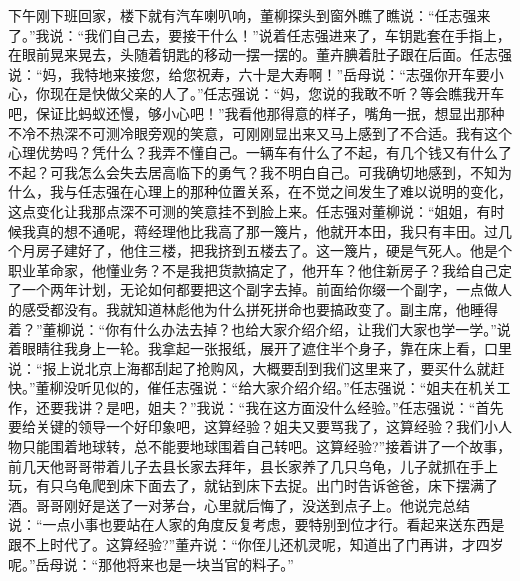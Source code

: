 \documentclass[12pt,oneside]{book}
\begin{document}
下午刚下班回家，楼下就有汽车喇叭响，董柳探头到窗外瞧了瞧说：``任志强来了。''我说：``我们自己去，要接干什么！''说着任志强进来了，车钥匙套在手指上，在眼前晃来晃去，头随着钥匙的移动一摆一摆的。董卉腆着肚子跟在后面。任志强说：``妈，我特地来接您，给您祝寿，六十是大寿啊！''岳母说：``志强你开车要小心，你现在是快做父亲的人了。''任志强说：``妈，您说的我敢不听？等会瞧我开车吧，保证比蚂蚁还慢，够小心吧！''我看他那得意的样子，嘴角一抿，想显出那种不冷不热深不可测冷眼旁观的笑意，可刚刚显出来又马上感到了不合适。我有这个心理优势吗？凭什么？我弄不懂自己。一辆车有什么了不起，有几个钱又有什么了不起？可我怎么会失去居高临下的勇气？我不明白自己。可我确切地感到，不知为什么，我与任志强在心理上的那种位置关系，在不觉之间发生了难以说明的变化，这点变化让我那点深不可测的笑意挂不到脸上来。任志强对董柳说：``姐姐，有时候我真的想不通呢，蒋经理他比我高了那一篾片，他就开本田，我只有丰田。过几个月房子建好了，他住三楼，把我挤到五楼去了。这一篾片，硬是气死人。他是个职业革命家，他懂业务？不是我把货款搞定了，他开车？他住新房子？我给自己定了一个两年计划，无论如何都要把这个副字去掉。前面给你缀一个副字，一点做人的感受都没有。我就知道林彪他为什么拼死拼命也要搞政变了。副主席，他睡得着？''董柳说：``你有什么办法去掉？也给大家介绍介绍，让我们大家也学一学。''说着眼睛往我身上一轮。我拿起一张报纸，展开了遮住半个身子，靠在床上看，口里说：``报上说北京上海都刮起了抢购风，大概要刮到我们这里来了，要买什么就赶快。''董柳没听见似的，催任志强说：``给大家介绍介绍。''任志强说：``姐夫在机关工作，还要我讲？是吧，姐夫？''我说：``我在这方面没什么经验。''任志强说：``首先要给关键的领导一个好印象吧，这算经验？姐夫又要骂我了，这算经验？我们小人物只能围着地球转，总不能要地球围着自己转吧。这算经验?''接着讲了一个故事，前几天他哥哥带着儿子去县长家去拜年，县长家养了几只乌龟，儿子就抓在手上玩，有只乌龟爬到床下面去了，就钻到床下去捉。出门时告诉爸爸，床下摆满了酒。哥哥刚好是送了一对茅台，心里就后悔了，没送到点子上。他说完总结说：``一点小事也要站在人家的角度反复考虑，要特别到位才行。看起来送东西是跟不上时代了。这算经验?''董卉说：``你侄儿还机灵呢，知道出了门再讲，才四岁呢。''岳母说：``那他将来也是一块当官的料子。''
\end{document}

